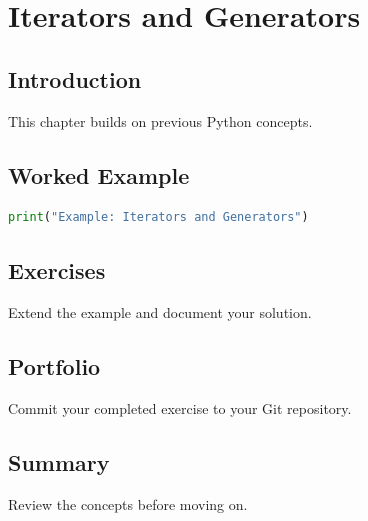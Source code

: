 \chapter{Iterators and Generators}
\label{chap:vol3-18}



\section{Introduction}
This chapter builds on previous Python concepts.

\section{Worked Example}
\begin{lstlisting}[language=Python]
print("Example: Iterators and Generators")
\end{lstlisting}

\section{Exercises}
\begin{exercise}
Extend the example and document your solution.
\end{exercise}

\section{Portfolio}
Commit your completed exercise to your Git repository.

\section{Summary}
Review the concepts before moving on.
